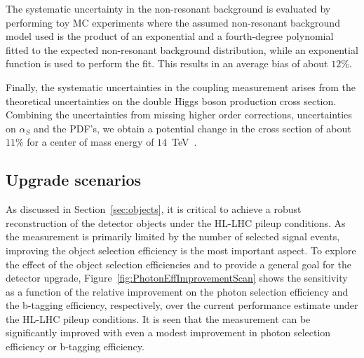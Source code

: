 The systematic uncertainty in the non-resonant background is evaluated by 
performing toy MC experiments where the assumed non-resonant background
model used is the product of an exponential and a fourth-degree polynomial fitted to
the expected non-resonant background distribution, while
an exponential function is used to perform the fit. This results in an
average bias of about $12\%$.

Finally, the systematic uncertainties in the coupling measurement arises from the 
theoretical uncertainties on the double Higgs boson production cross section. Combining
the uncertainties from missing higher order corrections, uncertainties on $\alpha_{S}$ and the PDF's, we obtain a potential change in the cross section of about $11\%$ for a center of mass energy of $14$~TeV~\cite{Baglio:2012np}.

\subsection{Upgrade scenarios}
\label{sec:scenarios}

As discussed in Section~\ref{sec:objects}, it is critical to achieve a robust reconstruction of the detector objects under the HL-LHC pileup conditions. As the measurement is primarily limited by the number of selected signal events, improving the object selection efficiency is the most important aspect. To explore the effect of the object selection efficiencies and to provide a general goal for the detector upgrade, Figure~\ref{fig:PhotonEffImprovementScan} shows the sensitivity as a function of the relative improvement on the photon selection efficiency and
the b-tagging efficiency, respectively, over the current performance estimate under the HL-LHC pileup conditions. It is seen that the measurement can be significantly improved with even a modest improvement in photon selection efficiency or b-tagging efficiency. 

